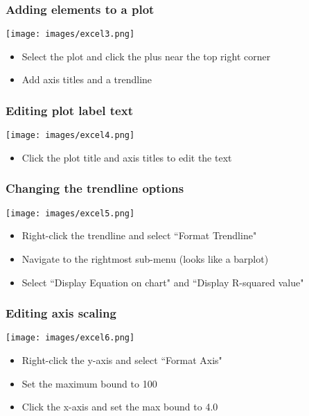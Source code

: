 \documentclass[11pt]{beamer}
\begin{document}
\begin{frame}
\frametitle{Adding elements to a plot}
\begin{center}
	\texttt{[image: images/excel3.png]} 
\end{center}
\begin{itemize}
	\item Select the plot and click the plus near the top right corner \pause
	\item Add axis titles and a trendline 
\end{itemize}
\end{frame}

\begin{frame}
\frametitle{Editing plot label text}
\begin{center}
	\texttt{[image: images/excel4.png]} 
\end{center}
\begin{itemize}
	\item Click the plot title and axis titles to edit the text 
\end{itemize}
\end{frame}

\begin{frame}
\frametitle{Changing the trendline options}
\begin{center}
	\texttt{[image: images/excel5.png]} 
\end{center}
\begin{itemize}
	\item Right-click the trendline and select ``Format Trendline" \pause
	\item Navigate to the rightmost sub-menu (looks like a barplot) \pause
	\item Select ``Display Equation on chart" and ``Display R-squared value"
\end{itemize}
\end{frame}

\begin{frame}
\frametitle{Editing axis scaling}
\begin{center}
	\texttt{[image: images/excel6.png]} 
\end{center}
\begin{itemize}
	\item Right-click the y-axis and select ``Format Axis" \pause
	\item Set the maximum bound to 100 \pause 
	\item Click the x-axis and set the max bound to 4.0
\end{itemize}
\end{frame}
\end{document}
